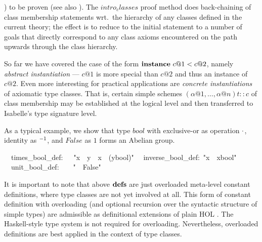 \begin{isabelle}
\begin{isamarkuptext}
 ) to be proven
 (see also \cite{isabelle-isar-ref}).  The $intro_classes$ proof
 method does back-chaining of class membership statements wrt.\ the
 hierarchy of any classes defined in the current theory; the effect is
 to reduce to the initial statement to a number of goals that directly
 correspond to any class axioms encountered on the path upwards
 through the class hierarchy.%
\end{isamarkuptext}%
%
%
\begin{isamarkuptext}%
So far we have covered the case of the form
 $\emph{\bf instance}~c@1 < c@2$, namely \emph{abstract
 instantiation} --- $c@1$ is more special than $c@2$ and thus an
 instance of $c@2$.  Even more interesting for practical applications
 are \emph{concrete instantiations} of axiomatic type classes.  That
 is, certain simple schemes $(\alpha@1, \ldots, \alpha@n)t :: c$ of
 class membership may be established at the logical level and then
 transferred to Isabelle's type signature level.

 \medskip As a typical example, we show that type $bool$ with
 exclusive-or as operation $\cdot$, identity as $\emph{${}^{-1}$}$, and
 $False$ as $1$ forms an Abelian group.%
\end{isamarkuptext}%
\isanewline
~~times\_bool\_def:~~~{"}x~{\isasymOtimes}~y~{\isasymequiv}~x~{\isasymnoteq}~(y{\isasymColon}bool){"}\isanewline
~~inverse\_bool\_def:~{"}x{\isasyminv}~{\isasymequiv}~x{\isasymColon}bool{"}\isanewline
~~unit\_bool\_def:~~~~{"}{\isasymunit}~{\isasymequiv}~False{"}%
\begin{isamarkuptext}%
\medskip It is important to note that above ${\mathord{\mathbf{defs}}}$ are just
 overloaded meta-level constant definitions, where type classes are
 not yet involved at all.  This form of constant definition with
 overloading (and optional recursion over the syntactic structure of
 simple types) are admissible as definitional extensions of plain HOL
 \cite{Wenzel:1997:TPHOL}.  The Haskell-style type system is not
 required for overloading.  Nevertheless, overloaded definitions are
 best applied in the context of type classes.


\end{isamarkuptext}
\end{isabelle}
